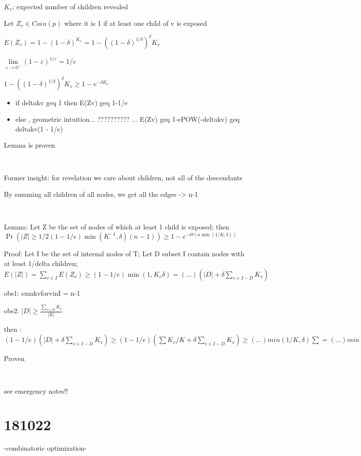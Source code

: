 \documentclass{report}
\begin{document}
	$K_v$: expected number of children revealed
	
	Let $Z_v \in Coin(p)$ where it is 1 if at least one child of v is exposed
	
	$\displaystyle E(Z_v) = 1 - (1 - \delta)^{K_v} = 1 - ((1 - \delta)^{1/\delta})^\delta{K_v}$
	
	$\lim\limits_{\varepsilon \to 0^+}(1-\varepsilon)^{1/\varepsilon} = 1/e$
	
	$1 - ((1 - \delta)^{1/\delta})^\delta{K_v} \geq 1- e^{-\delta K_v}$
	
	
	\begin{itemize}
		\item if deltakv geq 1 then E(Zv) geq 1-1/e
		\item else , geometric intuition... ?????????? ... E(Zv) geq 1-ePOW(-deltakv) geq deltakv(1 - 1/e)
	\end{itemize}
	Lemma is proven
	
	
	\
	
	Former insight: for revelation we care about children, not all of the descendants
	
	By summing all children of all nodes, we get all the edges -> n-1
	
	\
	
	Lemma: Let Z be the set of nodes of which at least 1 child is exposed; then $\Pr(|Z| \geq 1/2(1-1/e)\min(K^{-1}, \delta)(n-1))\geq 1-e^{-\Theta(n\min(1/K, \delta))}$
	
	Proof: Let I be the set of internal nodes of T; Let D subset I contain nodes with at least 1/delta children; $E(|Z|) = \sum_{v \in I}E(Z_v) \geq (1 - 1/e)\min(1, K_v\delta) = (...)(|D| + \delta\sum_{v \in I-D}K_v)$

	obs1: sumkvforvinI = n-1
	
	obs2: $|D| \geq \frac{\sum_{v \in D}K_v}{|K|}$
	
	then : $(1 - 1/e)(|D| + \delta\sum_{v \in I-D}K_v) \geq (1 - 1/e)(\sum K_v/K + \delta\sum_{v \in I-D}K_v) \geq (...)min(1/K, \delta)\sum = (...)min(...)(n-1)$
	
	Proven
	
	\
	
	see emergency notes!!
	
	\section{181022}
	
	-combinatoric optimization-
	
\end{document}
